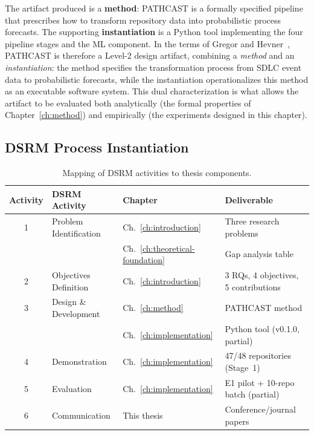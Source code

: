The artifact produced is a \textbf{method}: PATHCAST is a formally
specified pipeline that prescribes how to transform repository data into
probabilistic process forecasts. The supporting \textbf{instantiation} is
a Python tool implementing the four pipeline stages and the ML component.
In the terms of Gregor and Hevner~\cite{gregor2013positioning}, PATHCAST is
therefore a Level-2 design artifact, combining a \emph{method} and an
\emph{instantiation}: the method specifies the transformation process from
SDLC event data to probabilistic forecasts, while the instantiation
operationalizes this method as an executable software system. This dual
characterization is what allows the artifact to be evaluated both
analytically (the formal properties of Chapter~\ref{ch:method}) and
empirically (the experiments designed in this chapter).


\subsection{DSRM Process Instantiation}
\label{sec:dsrm-instantiation}

\begin{table}[htbp]
\centering
\caption{Mapping of DSRM activities to thesis components.}
\label{tab:dsrm-mapping}
\small
\begin{tabular}{clll}
\toprule
\textbf{Activity} & \textbf{DSRM Activity} & \textbf{Chapter} & \textbf{Deliverable} \\
\midrule
1 & Problem Identification & Ch.~\ref{ch:introduction} & Three research problems \\
  &                        & Ch.~\ref{ch:theoretical-foundation} & Gap analysis table \\
\midrule
2 & Objectives Definition  & Ch.~\ref{ch:introduction} & 3 RQs, 4 objectives, 5 contributions \\
\midrule
3 & Design \& Development  & Ch.~\ref{ch:method}        & PATHCAST method \\
  &                        & Ch.~\ref{ch:implementation} & Python tool (v0.1.0, partial) \\
\midrule
4 & Demonstration          & Ch.~\ref{ch:implementation} & 47/48 repositories (Stage~1) \\
\midrule
5 & Evaluation             & Ch.~\ref{ch:implementation} & E1 pilot + 10-repo batch (partial) \\
\midrule
6 & Communication          & This thesis                & Conference/journal papers \\
\bottomrule
\end{tabular}
\end{table}


